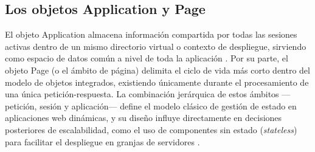 \subsection{Los objetos Application y Page}

El objeto Application almacena información compartida por todas las sesiones activas dentro de un mismo directorio virtual o contexto de despliegue, sirviendo como espacio de datos común a nivel de toda la aplicación \cite{yang_asp}. Por su parte, el objeto Page (o el ámbito de página) delimita el ciclo de vida más corto dentro del modelo de objetos integrados, existiendo únicamente durante el procesamiento de una única petición-respuesta. La combinación jerárquica de estos ámbitos —petición, sesión y aplicación— define el modelo clásico de gestión de estado en aplicaciones web dinámicas, y su diseño influye directamente en decisiones posteriores de escalabilidad, como el uso de componentes sin estado (\textit{stateless}) para facilitar el despliegue en granjas de servidores \cite{guidance_share}.
